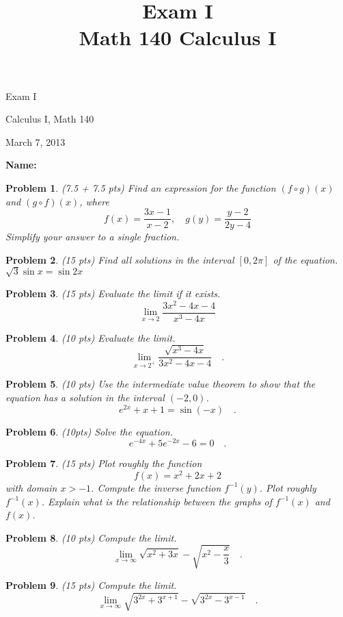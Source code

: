 \documentclass{article}
\date{}
\title{Exam I\\ Math 140 Calculus I }
\newtheorem{problem}{Problem}
\begin{document}
\begin{center}
\LARGE
Exam I 

Calculus I, Math 140

March 7, 2013
\end{center}

\noindent \textbf{Name:}
\medskip

\begin{problem}
(7.5 + 7.5 pts) Find an expression for the function $(f\circ g)(x)$ and $(g\circ f)(x)$, where 
\[
f(x)= \frac{3x-1}{x-2},\quad  g(y)=\frac{y-2 }{2y-4} 
\] Simplify your answer to a single fraction.
\end{problem}

\vskip 9cm

\begin{problem} (15 pts)
Find all solutions in the interval $[0,2\pi]$ of the equation.
$\sqrt{ 3}\sin x=  \sin 2x$
\end{problem}

\newpage
\begin{problem} (15 pts) Evaluate the limit if it exists.
\[\lim\limits_{x\to 2} \frac{3x^2-4x-4}{x^3-4x}
\]
\end{problem}

\vskip 9cm

\begin{problem} (10 pts)
Evaluate the limit.
\[\lim\limits_{x\to 2^+} \frac{\sqrt{x^3-4x }}{3x^2 -4x-4 }\quad .
\]
\end{problem}

\newpage
\begin{problem} (10 pts)
Use the intermediate value theorem to show that the equation has a solution in the interval $(-2,0)$.
\[e^{2x}+x+1 =\sin  (-x) \quad .
\]
\end{problem}
\vskip 9cm
\begin{problem} (10pts)
Solve the equation.
\[e^{-4x}+5e^{-2x}-6=0\quad .
\]
\end{problem}
\newpage
\begin{problem} (15 pts)
Plot roughly the function 
\[
f(x)= x^{2}+2x+2
\] with domain $x>-1$. Compute the inverse function $f^{-1}(y) $. Plot roughly $f^{-1}(x)$. Explain what is the relationship between the graphs of $f^{-1}(x)$ and $f(x)$.
\end{problem}
\vskip 9cm
\begin{problem} (10 pts)
Compute the limit.
\[\lim\limits_{x\to\infty}\sqrt{x^2+3x}-\sqrt{x^2-\frac{x}3}\quad .
\]
\end{problem}
\newpage 
{}
\begin{problem} (15 pts)
Compute the limit.
\[
\lim_{x\to \infty} \sqrt{ 3^{2x}+3^{x+1}}-\sqrt{3^{2x}-3^{x-1}}\quad .
\]

\end{problem}
\end{document}
